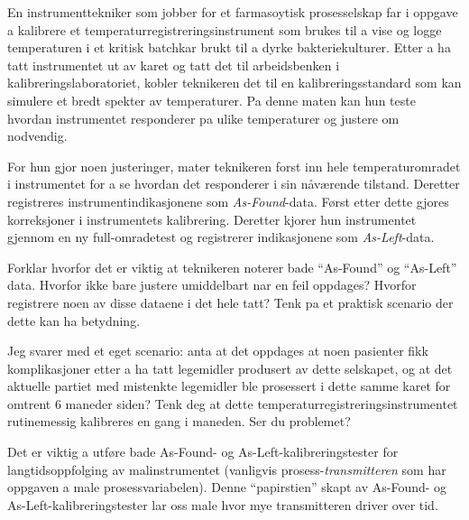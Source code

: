 

En instrumenttekniker som jobber for et farmasoytisk prosesselskap far i oppgave a kalibrere et temperaturregistreringsinstrument som brukes til a vise og logge temperaturen i et kritisk batchkar brukt til a dyrke bakteriekulturer.  Etter a ha tatt instrumentet ut av karet og tatt det til arbeidsbenken i kalibreringslaboratoriet, kobler teknikeren det til en kalibreringsstandard som kan simulere et bredt spekter av temperaturer.  Pa denne maten kan hun teste hvordan instrumentet responderer pa ulike temperaturer og justere om nodvendig.

For hun gjor noen justeringer, mater teknikeren forst inn hele temperaturomradet i instrumentet for a se hvordan det responderer i sin nåværende tilstand.  Deretter registreres instrumentindikasjonene som {\it As-Found}-data.  Først etter dette gjores korreksjoner i instrumentets kalibrering.  Deretter kjorer hun instrumentet gjennom en ny full-omradetest og registrerer indikasjonene som {\it As-Left}-data.

Forklar hvorfor det er viktig at teknikeren noterer bade ``As-Found'' og ``As-Left'' data.  Hvorfor ikke bare justere umiddelbart nar en feil oppdages?  Hvorfor registrere noen av disse dataene i det hele tatt?  Tenk pa et praktisk scenario der dette kan ha betydning.







Jeg svarer med et eget scenario: anta at det oppdages at noen pasienter fikk komplikasjoner etter a ha tatt legemidler produsert av dette selskapet, og at det aktuelle partiet med mistenkte legemidler ble prosessert i dette samme karet for omtrent 6 maneder siden?  Tenk deg at dette temperaturregistreringsinstrumentet rutinemessig kalibreres en gang i maneden.  Ser du problemet?







Det er viktig a utføre bade As-Found- og As-Left-kalibreringstester for langtidsoppfolging av malinstrumentet (vanligvis prosess-{\it transmitteren} som har oppgaven a male prosessvariabelen).  Denne ``papirstien'' skapt av As-Found- og As-Left-kalibreringstester lar oss male hvor mye transmitteren driver over tid.

